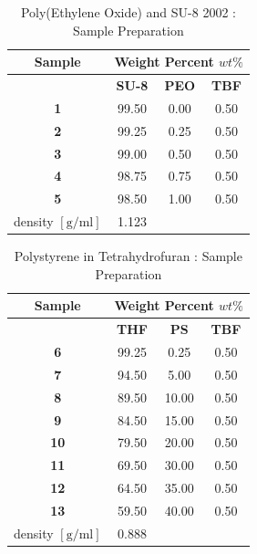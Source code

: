\begin{table}[!th]
\centering
\caption[Poly(Ethylene Oxide) and SU-8 2002 : Control Sample Preparation]{Poly(Ethylene Oxide) and SU-8 2002 : Sample Preparation}
\begin{tabular}{cccc}
\hline
\textbf{Sample} & \multicolumn{3}{c}{\textbf{Weight Percent} $wt\%$} \\
\hline
{}          & \textbf{SU-8} & \textbf{PEO} & \textbf{TBF} \\
\textbf{ 1} & 99.50         & 0.00         & 0.50         \\
\textbf{ 2} & 99.25         & 0.25         & 0.50         \\
\textbf{ 3} & 99.00         & 0.50         & 0.50         \\
\textbf{ 4} & 98.75         & 0.75         & 0.50         \\
\textbf{ 5} & 98.50         & 1.00         & 0.50         \\
\hline
density $[\textrm{g} / \textrm{ml}]$
   & 1.123         & {}           & {}           \\
\hline
\end{tabular}
\label{tab:PEOinSU8}
\end{table}

\begin{table}[!th]
\centering
\caption[Polystyrene in Tetrahydrofuran : Sample Preparation]{Polystyrene in Tetrahydrofuran : Sample Preparation}
\begin{tabular}{cccc}
\hline
\textbf{Sample} & \multicolumn{3}{c}{\textbf{Weight Percent} $wt\%$} \\
\hline
{}          & \textbf{THF} & \textbf{PS} & \textbf{TBF} \\
\textbf{ 6} & 99.25        &  0.25       & 0.50         \\
\textbf{ 7} & 94.50        &  5.00       & 0.50         \\
\textbf{ 8} & 89.50        & 10.00       & 0.50         \\
\textbf{ 9} & 84.50        & 15.00       & 0.50         \\
\textbf{10} & 79.50        & 20.00       & 0.50         \\
\textbf{11} & 69.50        & 30.00       & 0.50         \\
\textbf{12} & 64.50        & 35.00       & 0.50         \\
\textbf{13} & 59.50        & 40.00       & 0.50         \\
\hline
density $[\textrm{g} / \textrm{ml}]$
   & 0.888        & {}          & {}           \\
\hline
\end{tabular}
\label{tab:PSinTHF}
\end{table}

